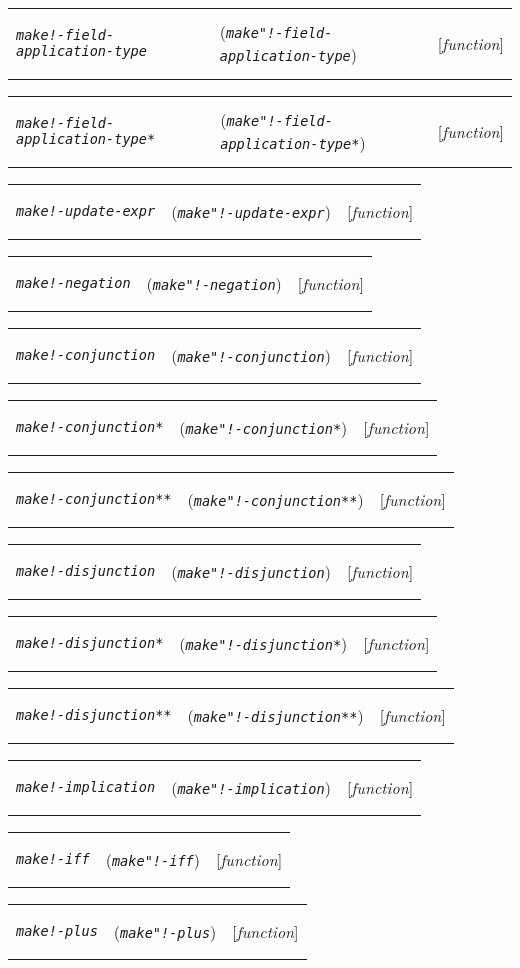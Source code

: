 \documentclass[12pt]{book}
\makeatletter
\newcommand{\functionnm}[1]{\texttt{\textit{#1}}}
\newenvironment{functioni}[3]%
{\par\noindent\begin{boxedminipage}{\textwidth}%
 \par\noindent\begin{tabularx}{\linewidth}{lXr}%
 \hypertarget{#1}{\functionnm{#1}}\index{#2@\functionnm{#2}|underline}%
   &(\texttt{\textit{#2}})&[\emph{function}]%
 \end{tabularx}\par}
{\end{boxedminipage}}
\makeatother
\begin{document}
\begin{functioni}{make!-field-application-type}{make"!-field-application-type}{field-id type arg}
\end{functioni}

\begin{functioni}{make!-field-application-type*}{make"!-field-application-type*}{fields field-id arg}
\end{functioni}

\begin{functioni}{make!-update-expr}{make"!-update-expr}{expression assignments}
\end{functioni}

\begin{functioni}{make!-negation}{make"!-negation}{ex}
\end{functioni}

\begin{functioni}{make!-conjunction}{make"!-conjunction}{ex1 ex2}
\end{functioni}

\begin{functioni}{make!-conjunction*}{make"!-conjunction*}{exprs}
\end{functioni}

\begin{functioni}{make!-conjunction**}{make"!-conjunction**}{exprs conj}
\end{functioni}

\begin{functioni}{make!-disjunction}{make"!-disjunction}{ex1 ex2}
\end{functioni}

\begin{functioni}{make!-disjunction*}{make"!-disjunction*}{exprs}
\end{functioni}

\begin{functioni}{make!-disjunction**}{make"!-disjunction**}{exprs disj}
\end{functioni}

\begin{functioni}{make!-implication}{make"!-implication}{ex1 ex2}
\end{functioni}

\begin{functioni}{make!-iff}{make"!-iff}{ex1 ex2}
\end{functioni}

\begin{functioni}{make!-plus}{make"!-plus}{ex1 ex2}
\end{functioni}
\end{document}
